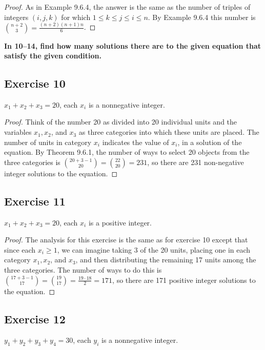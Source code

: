 \documentclass[14pt]{extarticle}
\newcommand{\cy}{\color{cyan}}
\begin{document}
\begin{proof}
     As in Example 9.6.4, the answer is the same as the number of triples of integers \((i, j, k)\) for which \(1 \leq k \leq j
     \leq i \leq n\). By Example 9.6.4 this number is \(\binom{n+2}{3} = \frac{(n+2)(n+1)n}{6}\).
\end{proof}

{\bf \cy In 10–14, find how many solutions there are to the given equation that satisfy the given condition.}

\subsection{Exercise 10}
\(x_1 + x_2 + x_3 = 20\), each \(x_i\) is a nonnegative integer.

\begin{proof}
     Think of the number 20 as divided into 20 individual units and the variables \(x_1, x_2\), and \(x_3\) as three categories
     into which these units are placed. The number of units in category \(x_i\) indicates the value of \(x_i\), in a solution
     of the equation. By Theorem 9.6.1, the number of ways to select 20 objects from the three categories is
     \(\binom{20+3-1}{20} = \binom{22}{20} = 231\), so there are 231 non-negative integer solutions to the equation.
\end{proof}

\subsection{Exercise 11}
\(x_1 + x_2 + x_3 = 20\), each \(x_i\) is a positive integer.

\begin{proof}
     The analysis for this exercise is the same as for exercise 10 except that since each \(x_i \geq 1\), we can imagine taking 3
     of the 20 units, placing one in each category \(x_1, x_2\), and \(x_3\), and then distributing the remaining 17 units
     among the three categories. The number of ways to do this is \(\binom{17+3-1}{17} = \binom{19}{17} = \frac{19 \cdot 18}{2} =
     171\), so there are 171 positive integer solutions to the equation.
\end{proof}

\subsection{Exercise 12}
\(y_1 + y_2 + y_3 + y_4 = 30\), each \(y_i\) is a nonnegative integer.
\end{document}
